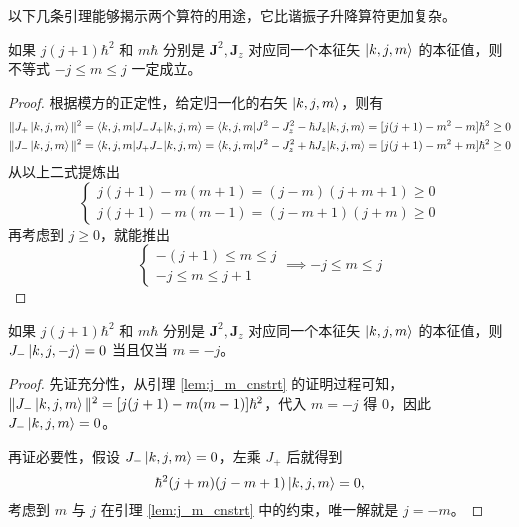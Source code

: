 \documentclass[cn,10pt,math=newtx,citestyle=gb7714-2015,bibstyle=gb7714-2015]{elegantbook}
\def\bm{\boldsymbol}
\begin{document}
以下几条引理能够揭示两个算符的用途，它比谐振子升降算符更加复杂。
\begin{lemma}[$\bm J^2$ 和 $J_z$ 本征值之间的约束关系]\label{lem:j_m_cnstrt}
    如果 $j(j+1)\hbar^2$ 和 $m\hbar$ 分别是 $\bm J^2,\bm J_z$ 对应同一个本征矢 $\ket{k,j,m}$ 的本征值，则不等式 $-j\le m\le j$ 一定成立。
\end{lemma}
\begin{proof}
    根据模方的正定性，给定归一化的右矢 $\ket{k,j,m}$，则有
    \begin{align}
        \|J_+\ket{k,j,m}\|^2 &= \braket{k,j,m|J_-J_+|k,j,m} = \braket{k,j,m|J^2-J_z^2-\hbar J_z|k,j,m} = [j(j+1)-m^2-m]\hbar^2\ge 0\\
        \|J_-\ket{k,j,m}\|^2 &= \braket{k,j,m|J_+J_-|k,j,m} = \braket{k,j,m|J^2-J_z^2+\hbar J_z|k,j,m} = [j(j+1)-m^2+m]\hbar^2\ge 0
    \end{align}
    从以上二式提炼出
    \begin{equation}
        \begin{cases}
        j(j+1)-m(m+1)=(j-m)(j+m+1)\ge 0\\
        j(j+1)-m(m-1)=(j-m+1)(j+m)\ge 0
    \end{cases}
    \end{equation}
    再考虑到 $j\ge 0$，就能推出
    \begin{equation}
        \begin{cases}
            -(j+1) \le m \le j\\
            -j\le m \le j+1
        \end{cases}\implies -j\le m\le j
    \end{equation}
\end{proof}

\begin{lemma}[降算符的零空间]\label{lem:anglr_lwr_oprtr_nll_spc}
    如果 $j(j+1)\hbar^2$ 和 $m\hbar$ 分别是 $\bm J^2,\bm J_z$ 对应同一个本征矢 $\ket{k,j,m}$ 的本征值，则 $J_-\ket{k,j,-j} = 0$ 当且仅当 $m=-j$。
\end{lemma}
\begin{proof}
    先证充分性，从引理 \ref{lem:j_m_cnstrt} 的证明过程可知，$\|J_-\ket{k,j,m}\|^2 = [j(j+1)-m(m-1)]\hbar^2$，代入 $m=-j$ 得 0，因此 $J_-\ket{k,j,m} = 0$。
    
    再证必要性，假设 $J_-\ket{k,j,m}=0$，左乘 $J_+$ 后就得到
    \begin{equation}
        \hbar^2(j+m)(j-m+1)\ket{k,j,m}=0,
    \end{equation}
    考虑到 $m$ 与 $j$ 在引理 \ref{lem:j_m_cnstrt} 中的约束，唯一解就是 $j=-m$。
\end{proof}
\end{document}
